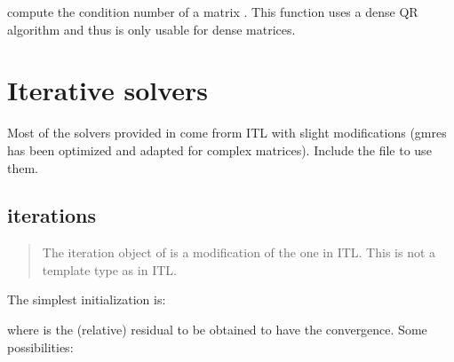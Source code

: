 \documentclass[a4paper,11pt,english]{sphinxmanual}
\begin{document}
\begin{sphinxVerbatim}[commandchars=\\\{\}]
\end{sphinxVerbatim}

compute the condition number of a matrix . This function uses a dense QR algorithm and thus is only usable for dense matrices.


\chapter{Iterative solvers}
\label{\detokenize{gmm/iter:iterative-solvers}}\label{\detokenize{gmm/iter:gmm-iter}}\label{\detokenize{gmm/iter::doc}}
Most of the solvers provided in  come frorm ITL with slight modifications (gmres has been optimized and adapted for complex matrices). Include the file  to use them.


\section{iterations}
\label{\detokenize{gmm/iter:iterations}}\begin{quote}

The iteration object of  is a modification of the one in ITL. This is not a template type as in ITL.
\end{quote}

The simplest initialization is:

\begin{sphinxVerbatim}[commandchars=\\\{\}]
 
\end{sphinxVerbatim}

where  is the (relative) residual to be obtained to have the convergence.
Some possibilities:
\end{document}
